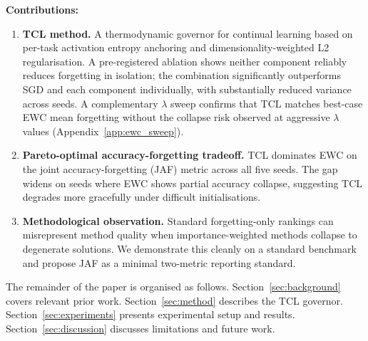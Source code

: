 \noindent\textbf{Contributions:}
\begin{enumerate}
    \item \textbf{TCL method.} A thermodynamic governor for continual learning based on
          per-task activation entropy anchoring and dimensionality-weighted L2 regularisation.
          A pre-registered ablation shows neither component reliably reduces
          forgetting in isolation; the combination significantly outperforms SGD
          and each component individually, with substantially reduced variance
          across seeds.
          A complementary $\lambda$ sweep confirms that TCL matches best-case
          EWC mean forgetting without the collapse risk observed at aggressive
          $\lambda$ values (Appendix~\ref{app:ewc_sweep}).

    \item \textbf{Pareto-optimal accuracy-forgetting tradeoff.} TCL dominates EWC on the
          joint accuracy-forgetting (JAF) metric across all five seeds. The gap widens on
          seeds where EWC shows partial accuracy collapse, suggesting TCL degrades more
          gracefully under difficult initialisations.

    \item \textbf{Methodological observation.} Standard forgetting-only rankings can
          misrepresent method quality when importance-weighted methods collapse to
          degenerate solutions. We demonstrate this cleanly on a standard benchmark and
          propose JAF as a minimal two-metric reporting standard.
\end{enumerate}

The remainder of the paper is organised as follows.
Section~\ref{sec:background} covers relevant prior work.
Section~\ref{sec:method} describes the TCL governor.
Section~\ref{sec:experiments} presents experimental setup and results.
Section~\ref{sec:discussion} discusses limitations and future work.

